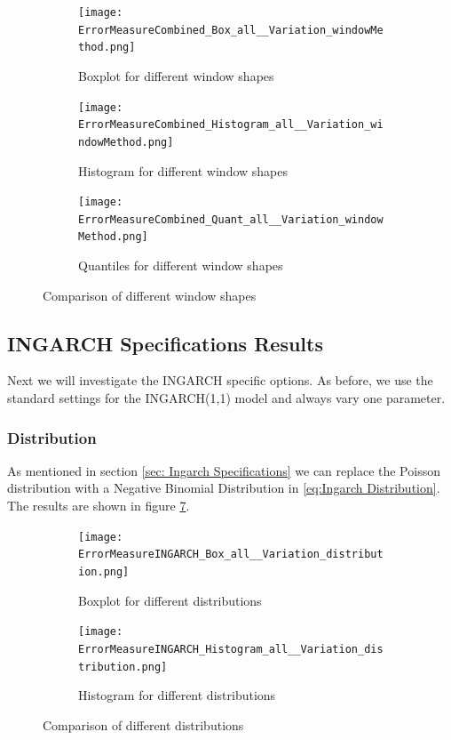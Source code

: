 \begin{figure}[htb!]
\centering
\begin{subfigure}[b]{0.45\textwidth}
\texttt{[image: ErrorMeasureCombined\_Box\_all\_\_Variation\_windowMethod.png]}
\caption{Boxplot for different window shapes}
\label{fig:window methods Box}
\end{subfigure}
\hfill
\begin{subfigure}[b]{0.45\textwidth}
\texttt{[image: ErrorMeasureCombined\_Histogram\_all\_\_Variation\_windowMethod.png]}
\caption{Histogram for different window shapes}
\label{fig:window methods Hist}
\end{subfigure}
\hfill
\begin{subfigure}[b]{0.8\textwidth}
\texttt{[image: ErrorMeasureCombined\_Quant\_all\_\_Variation\_windowMethod.png]}
\caption{Quantiles for different window shapes}
\label{fig:window methods Quant}
\end{subfigure}
\caption{Comparison of different window shapes}
\label{fig:window methods Comp1}
\end{figure}


\subsection{INGARCH Specifications Results}
\label{sec: Ingarch Specifications Results}

Next we will investigate the INGARCH specific options. As before, we use the standard settings for the INGARCH(1,1) model and always vary one parameter. 

\subsubsection{Distribution}
\label{sec:Distribution}

As mentioned in section \ref{sec: Ingarch Specifications} we can replace the Poisson distribution with a Negative Binomial Distribution in \ref{eq:Ingarch Distribution}. The results are shown in figure \ref{fig:distributions Comp1}. 

\begin{figure}[htb!]
\centering
\begin{subfigure}[b]{0.45\textwidth}
\texttt{[image: ErrorMeasureINGARCH\_Box\_all\_\_Variation\_distribution.png]}
\caption{Boxplot for different distributions}
\label{fig:distributions Box}
\end{subfigure}
\hfill
\begin{subfigure}[b]{0.45\textwidth}
\texttt{[image: ErrorMeasureINGARCH\_Histogram\_all\_\_Variation\_distribution.png]}
\caption{Histogram for different distributions}
\label{fig:distributions Hist}
\end{subfigure}
\hfill
\caption{Comparison of different distributions}
\label{fig:distributions Comp1}
\end{figure}

